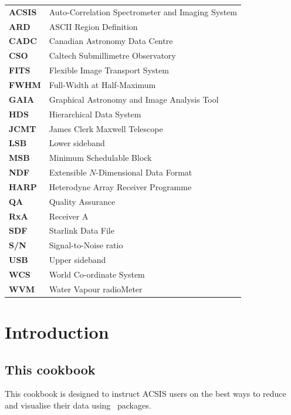 \documentclass[11pt,oneside,chapters]{starlink}
\begin{document}
\scfrontmatter

\Acronyms

\begin{table}[h!]
\begin{tabular}{ll}
\textbf{ACSIS}& Auto-Correlation Spectrometer and Imaging System\\
\textbf{ARD}& ASCII Region Definition\\
\textbf{CADC}& Canadian Astronomy Data Centre\\
\textbf{CSO}& Caltech Submillimetre Observatory\\
\textbf{FITS}& Flexible Image Transport System\\
\textbf{FWHM}& Full-Width at Half-Maximum\\
\textbf{GAIA}& Graphical Astronomy and Image Analysis Tool\\
\textbf{HDS}& Hierarchical Data System\\
\textbf{JCMT}& James Clerk Maxwell Telescope\\
\textbf{LSB}& Lower sideband\\
\textbf{MSB}& Minimum Schedulable Block\\
\textbf{NDF}& Extensible $N$-Dimensional Data Format\\
\textbf{HARP}& Heterodyne Array Receiver Programme\\
\textbf{QA}& Quality Assurance\\
\textbf{RxA}& Receiver A\\
\textbf{SDF}& Starlink Data File\\
\textbf{S/N}& Signal-to-Noise ratio\\
\textbf{USB}& Upper sideband\\
\textbf{WCS}& World Co-ordinate System\\
\textbf{WVM}& Water Vapour radioMeter\\
\end{tabular}
\end{table}


\chapter{Introduction}
\label{sec:intro}

\section{This cookbook}
This cookbook is designed to instruct ACSIS users on the best ways to
reduce and visualise their data using \starlink\ packages.
\end{document}
